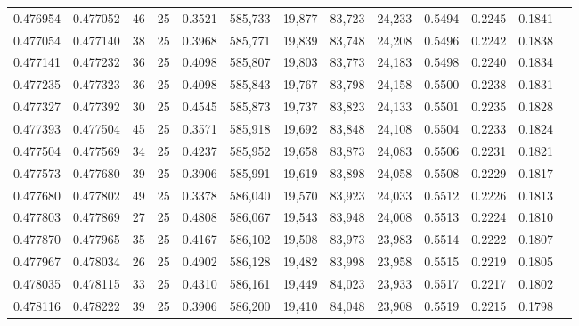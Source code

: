 \begin{tabular}{rrrrrrrrrrrrr}
0.476954 & 0.477052 &    46 &  25 &                                     0.3521 & 585,733 &  19,877 &  83,723 &  24,233 & 0.5494 & 0.2245 & 0.1841 \\
0.477054 & 0.477140 &    38 &  25 &                                     0.3968 & 585,771 &  19,839 &  83,748 &  24,208 & 0.5496 & 0.2242 & 0.1838 \\
0.477141 & 0.477232 &    36 &  25 &                                     0.4098 & 585,807 &  19,803 &  83,773 &  24,183 & 0.5498 & 0.2240 & 0.1834 \\
0.477235 & 0.477323 &    36 &  25 &                                     0.4098 & 585,843 &  19,767 &  83,798 &  24,158 & 0.5500 & 0.2238 & 0.1831 \\
0.477327 & 0.477392 &    30 &  25 &                                     0.4545 & 585,873 &  19,737 &  83,823 &  24,133 & 0.5501 & 0.2235 & 0.1828 \\
0.477393 & 0.477504 &    45 &  25 &                                     0.3571 & 585,918 &  19,692 &  83,848 &  24,108 & 0.5504 & 0.2233 & 0.1824 \\
0.477504 & 0.477569 &    34 &  25 &                                     0.4237 & 585,952 &  19,658 &  83,873 &  24,083 & 0.5506 & 0.2231 & 0.1821 \\
0.477573 & 0.477680 &    39 &  25 &                                     0.3906 & 585,991 &  19,619 &  83,898 &  24,058 & 0.5508 & 0.2229 & 0.1817 \\
0.477680 & 0.477802 &    49 &  25 &                                     0.3378 & 586,040 &  19,570 &  83,923 &  24,033 & 0.5512 & 0.2226 & 0.1813 \\
0.477803 & 0.477869 &    27 &  25 &                                     0.4808 & 586,067 &  19,543 &  83,948 &  24,008 & 0.5513 & 0.2224 & 0.1810 \\
0.477870 & 0.477965 &    35 &  25 &                                     0.4167 & 586,102 &  19,508 &  83,973 &  23,983 & 0.5514 & 0.2222 & 0.1807 \\
0.477967 & 0.478034 &    26 &  25 &                                     0.4902 & 586,128 &  19,482 &  83,998 &  23,958 & 0.5515 & 0.2219 & 0.1805 \\
0.478035 & 0.478115 &    33 &  25 &                                     0.4310 & 586,161 &  19,449 &  84,023 &  23,933 & 0.5517 & 0.2217 & 0.1802 \\
0.478116 & 0.478222 &    39 &  25 &                                     0.3906 & 586,200 &  19,410 &  84,048 &  23,908 & 0.5519 & 0.2215 & 0.1798 \\

\end{tabular}
